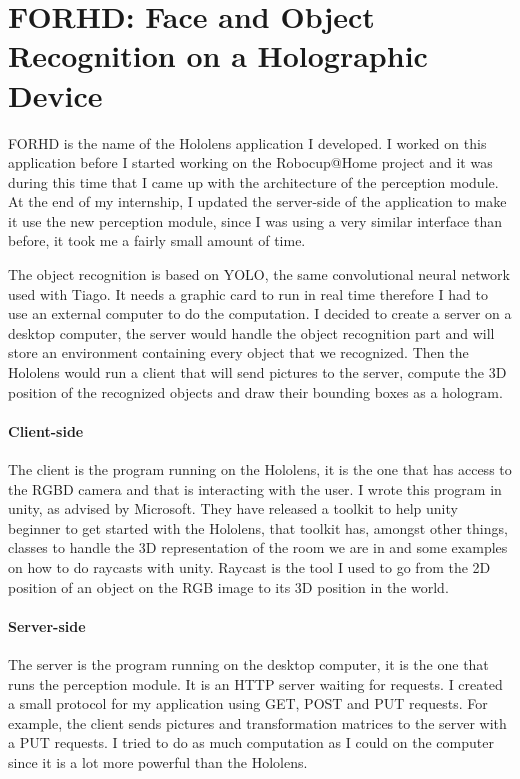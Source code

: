 \documentclass[a4paper, twocolumn]{article}
\begin{document}
    \section{FORHD: Face and Object Recognition on a Holographic Device}
    
    FORHD is the name of the Hololens application I developed. I worked on this application before I started working on the Robocup@Home project and it was during this time that I came up with the architecture of the perception module. At the end of my internship, I updated the server-side of the application to make it use the new perception module, since I was using a very similar interface than before, it took me a fairly small amount of time.
    
    The object recognition is based on YOLO, the same convolutional neural network used with Tiago. It needs a graphic card to run in real time therefore I had to use an external computer to do the computation. I decided to create a server on a desktop computer, the server would handle the object recognition part and will store an environment containing every object that we recognized. Then the Hololens would run a client that will send pictures to the server, compute the 3D position of the recognized objects and draw their bounding boxes as a hologram.
    
    \paragraph{Client-side}
    
    The client is the program running on the Hololens, it is the one that has access to the RGBD camera and that is interacting with the user. I wrote this program in unity, as advised by Microsoft. They have released a toolkit to help unity beginner to get started with the Hololens, that toolkit has, amongst other things, classes to handle the 3D representation of the room we are in and some examples on how to do raycasts with unity. Raycast is the tool I used to go from the 2D position of an object on the RGB image to its 3D position in the world.
    
    \paragraph{Server-side}
    
    The server is the program running on the desktop computer, it is the one that runs the perception module. It is an HTTP server waiting for requests. I created a small protocol for my application using GET, POST and PUT requests. For example, the client sends pictures and transformation matrices to the server with a PUT requests. I tried to do as much computation as I could on the computer since it is a lot more powerful than the Hololens.
    
\end{document}
